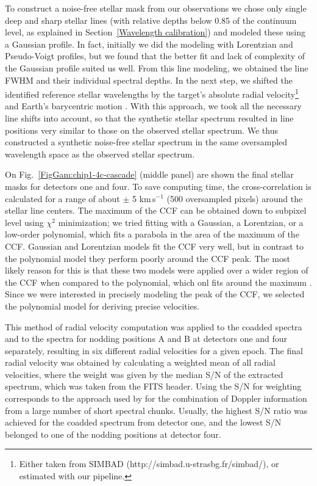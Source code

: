 \documentclass{aa}
\begin{document}
 
To construct a noise-free stellar mask from our observations we chose only single deep and sharp stellar lines
(with relative depths below 0.85 of the continuum level, as explained in Section~\ref{Wavelength calibration})
and modeled these using a Gaussian profile.
In fact, initially we did the modeling with Lorentzian and Pseudo-Voigt profiles,
but we found that the better fit and lack of complexity of the Gaussian profile suited us well. From this line modeling, we obtained the line FWHM and their individual spectral depths. 
In the next step, we shifted the identified reference stellar wavelengths by the target's 
absolute radial velocity\footnote{Either taken from SIMBAD 
(http://simbad.u-strasbg.fr/simbad/), or estimated with our pipeline.} and
Earth's barycentric motion \citep[accuracy better than~$\sim$~1~m\,s$^{-1}$,][]{roytman13}. 
With this approach, we took all the necessary line shifts into account, so that the synthetic stellar 
spectrum resulted in line positions very similar to those on the observed stellar spectrum.
We thus constructed a synthetic noise-free stellar spectrum in the same oversampled wavelength space 
as the observed stellar spectrum.

On Fig.~\ref{FigGam:chip1-4c-cascade} (middle panel) are shown the final stellar masks for detectors one and four. 
To save computing time, the cross-correlation is calculated for a range of about $\pm$ 5 km\,s$^{-1}$ 
(500 oversampled pixels) around the stellar line centers. 
The maximum of the CCF can be obtained down to subpixel level using $\chi^2$ minimization;
we tried fitting with a Gaussian, a Lorentzian, or a low-order polynomial, which fits a parabola
in the area of the maximum of the CCF.
Gaussian and Lorentzian models fit the CCF very well, but in contrast to the polynomial model 
they perform poorly around the CCF peak. 
The most likely reason for this is that these two models were applied over a wider region 
of the CCF when compared to the polynomial, which onl fits  around the maximum \citep{Prieto2007}.
Since we were interested in precisely modeling  the peak of the CCF, 
we selected the polynomial model  for deriving precise velocities. 


 

This method of radial velocity computation was applied to the coadded spectra 
and to the spectra for nodding positions A and B at detectors one and four separately,
resulting in six different radial velocities for a given epoch. 
The final radial velocity was obtained by calculating a weighted mean of all radial velocities, 
where the weight was given by the median S/N of the extracted spectrum, which was taken from the FITS header. 
Using the S/N for weighting corresponds to the approach used by \citet{Butler}
for the combination of Doppler information from a large number of short spectral chunks.
Usually, the highest S/N ratio was achieved for the coadded spectrum
from detector one, and the lowest S/N belonged to one of the nodding positions at detector four.
 
\end{document}
